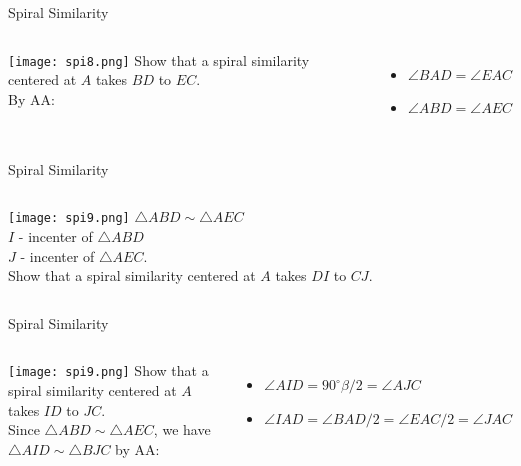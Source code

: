 \documentclass{beamer}
\begin{document}
\begin{frame}{Spiral Similarity}
	\begin{columns}
		\texttt{[image: spi8.png]}
		Show that a spiral similarity centered at $A$ takes
		$BD$ to $EC$.\\
		\phantom{Spacing}
		By AA:
		\begin{itemize}
			\item $\angle BAD = \angle EAC$
			\item $\angle ABD = \angle AEC$
		\end{itemize}
	\end{columns}
\end{frame}
\begin{frame}{Spiral Similarity}
	\begin{columns}
		\column{0.6\textwidth}
		\texttt{[image: spi9.png]}
		\column{0.4\textwidth}
		$\triangle ABD \sim \triangle AEC$\\
		$I$ - incenter of $\triangle ABD$\\
		$J$ - incenter of $\triangle AEC$.\\
		\phantom{Spacing}
		Show that a spiral similarity centered at $A$ takes
		$DI$ to $CJ$.
	\end{columns}
\end{frame}
\begin{frame}{Spiral Similarity}
	\begin{columns}
		\texttt{[image: spi9.png]}
		Show that a spiral similarity centered at $A$ takes
		$ID$ to $JC$.\\
		\phantom{Spacing}
		Since $\triangle ABD\sim \triangle AEC$, we have
		$\triangle AID\sim \triangle BJC$ by AA:
		\begin{itemize}
			\item $\angle AID = 90^\circ \beta / 2 = \angle AJC$
			\item $\angle IAD = \angle BAD / 2 = \angle EAC / 2
				= \angle JAC$
		\end{itemize}
	\end{columns}
\end{frame}
\end{document}
